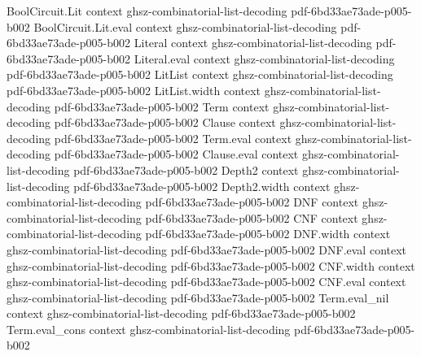 \begin{lemma}
\label{BoolFourier.fourier_coeff_char_self}
\leanok
{}
\proofstep
  {BoolCircuit.Lit}
  {context}
  {ghsz-combinatorial-list-decoding}
  {pdf-6bd33ae73ade-p005-b002}
\proofstep
  {BoolCircuit.Lit.eval}
  {context}
  {ghsz-combinatorial-list-decoding}
  {pdf-6bd33ae73ade-p005-b002}
\proofstep
  {Literal}
  {context}
  {ghsz-combinatorial-list-decoding}
  {pdf-6bd33ae73ade-p005-b002}
\proofstep
  {Literal.eval}
  {context}
  {ghsz-combinatorial-list-decoding}
  {pdf-6bd33ae73ade-p005-b002}
\proofstep
  {LitList}
  {context}
  {ghsz-combinatorial-list-decoding}
  {pdf-6bd33ae73ade-p005-b002}
\proofstep
  {LitList.width}
  {context}
  {ghsz-combinatorial-list-decoding}
  {pdf-6bd33ae73ade-p005-b002}
\proofstep
  {Term}
  {context}
  {ghsz-combinatorial-list-decoding}
  {pdf-6bd33ae73ade-p005-b002}
\proofstep
  {Clause}
  {context}
  {ghsz-combinatorial-list-decoding}
  {pdf-6bd33ae73ade-p005-b002}
\proofstep
  {Term.eval}
  {context}
  {ghsz-combinatorial-list-decoding}
  {pdf-6bd33ae73ade-p005-b002}
\proofstep
  {Clause.eval}
  {context}
  {ghsz-combinatorial-list-decoding}
  {pdf-6bd33ae73ade-p005-b002}
\proofstep
  {Depth2}
  {context}
  {ghsz-combinatorial-list-decoding}
  {pdf-6bd33ae73ade-p005-b002}
\proofstep
  {Depth2.width}
  {context}
  {ghsz-combinatorial-list-decoding}
  {pdf-6bd33ae73ade-p005-b002}
\proofstep
  {DNF}
  {context}
  {ghsz-combinatorial-list-decoding}
  {pdf-6bd33ae73ade-p005-b002}
\proofstep
  {CNF}
  {context}
  {ghsz-combinatorial-list-decoding}
  {pdf-6bd33ae73ade-p005-b002}
\proofstep
  {DNF.width}
  {context}
  {ghsz-combinatorial-list-decoding}
  {pdf-6bd33ae73ade-p005-b002}
\proofstep
  {DNF.eval}
  {context}
  {ghsz-combinatorial-list-decoding}
  {pdf-6bd33ae73ade-p005-b002}
\proofstep
  {CNF.width}
  {context}
  {ghsz-combinatorial-list-decoding}
  {pdf-6bd33ae73ade-p005-b002}
\proofstep
  {CNF.eval}
  {context}
  {ghsz-combinatorial-list-decoding}
  {pdf-6bd33ae73ade-p005-b002}
\proofstep
  {Term.eval_nil}
  {context}
  {ghsz-combinatorial-list-decoding}
  {pdf-6bd33ae73ade-p005-b002}
\proofstep
  {Term.eval_cons}
  {context}
  {ghsz-combinatorial-list-decoding}
  {pdf-6bd33ae73ade-p005-b002}
\proofstep

\end{lemma}
